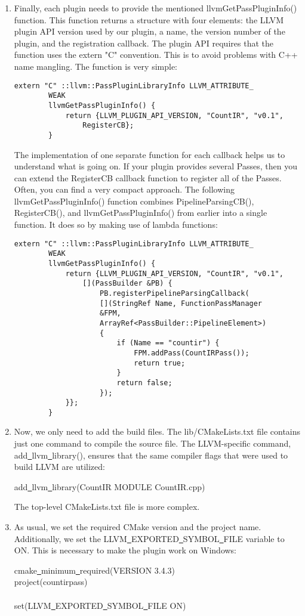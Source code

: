 \begin{enumerate}
	\item Finally, each plugin needs to provide the mentioned llvmGetPassPluginInfo() function. This function returns a structure with four elements: the LLVM plugin API version used by our plugin, a name, the version number of the plugin, and the registration callback. The plugin API requires that the function uses the extern "C" convention. This is to avoid problems with C++ name mangling. The function is very simple:
	\begin{lstlisting}[caption={}]
		extern "C" ::llvm::PassPluginLibraryInfo LLVM_ATTRIBUTE_
		WEAK
		llvmGetPassPluginInfo() {
			return {LLVM_PLUGIN_API_VERSION, "CountIR", "v0.1",
				RegisterCB};
		}
	\end{lstlisting}
	The implementation of one separate function for each callback helps us to understand what is going on. If your plugin provides several Passes, then you can extend the RegisterCB callback function to register all of the Passes. Often, you can find a very compact approach. The following llvmGetPassPluginInfo() function combines PipelineParsingCB(), RegisterCB(), and llvmGetPassPluginInfo() from earlier into a single function. It does so by making use of lambda functions:
	\begin{lstlisting}[caption={}]
		extern "C" ::llvm::PassPluginLibraryInfo LLVM_ATTRIBUTE_
		WEAK
		llvmGetPassPluginInfo() {
			return {LLVM_PLUGIN_API_VERSION, "CountIR", "v0.1",
				[](PassBuilder &PB) {
					PB.registerPipelineParsingCallback(
					[](StringRef Name, FunctionPassManager 
					&FPM,
					ArrayRef<PassBuilder::PipelineElement>) 
					{
						if (Name == "countir") {
							FPM.addPass(CountIRPass());
							return true;
						}
						return false;
					});
			}};
		}
	\end{lstlisting}
	
	\item Now, we only need to add the build files. The lib/CMakeLists.txt file contains just one command to compile the source file. The LLVM-specific command, add\underline{~}llvm\underline{~}library(), ensures that the same compiler flags that were used to build LLVM are utilized:
	\begin{tcolorbox}[colback=white,colframe=black]
		add\underline{~}llvm\underline{~}library(CountIR MODULE CountIR.cpp)
	\end{tcolorbox}
	The top-level CMakeLists.txt file is more complex.
	
	\item As usual, we set the required CMake version and the project name. Additionally, we set the LLVM\underline{~}EXPORTED\underline{~}SYMBOL\underline{~}FILE variable to ON. This is necessary to make the plugin work on Windows:
	\begin{tcolorbox}[colback=white,colframe=black]
		cmake\underline{~}minimum\underline{~}required(VERSION 3.4.3) \\
		project(countirpass)\\
		\\
		set(LLVM\underline{~}EXPORTED\underline{~}SYMBOL\underline{~}FILE ON)
	\end{tcolorbox}
	

\end{enumerate}
